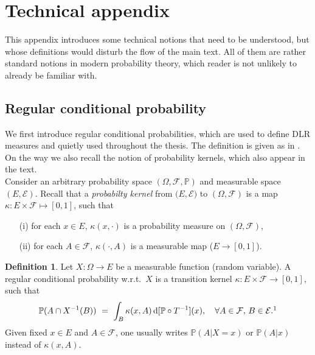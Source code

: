 \documentclass[12pt]{article}
\renewcommand{\d}{\mathrm{d}}
\newcommand{\F}{\mathcal{F}}
\renewcommand{\P}{\mathbb{P}}
\newcommand{\set}[1]{\left\{#1\right\}}
\newcommand{\ra}{\rightarrow}
\newcommand{\pika}{\boldsymbol{\cdot}}
\newcommand{\1}{\mathbbm{1}}
\newcommand{\5}{\vspace{0.5cm}}
\theoremstyle{definition}
\newtheorem{df}[thm]{Definition}
\begin{document}
\pagebreak




\appendix

\section{Technical appendix}

This appendix introduces some technical notions that need to be understood, but whose definitions would disturb the flow of the main text. All of them are rather standard notions in modern probability theory, which reader is not unlikely to already be familiar with.


\subsection{Regular conditional probability}\label{app:1}

We first introduce regular conditional probabilities, which are used to define DLR measures and quietly used throughout the thesis. The definition is given as in \cite{LFR}. On the way we also recall the notion of probability kernels, which also appear in the text. \\

Consider an arbitrary probability space $(\Omega,\F,\P)$ and measurable space $(E,\mathcal{E})$. Recall that a \textit{probabilty kernel} from $(E,\mathcal{E)}$ to $(\Omega,\F)$ is a map $\kappa:E\times\F\mapsto[0,1]$, such that
\begin{itemize}
	\item[(i)] for each $x\in E$, $\kappa(x,\pika)$ is a probability measure on $(\Omega,\F)$,
	\item[(ii)] for each $A\in\F$, $\kappa(\pika,A)$ is a measurable map ($E\ra[0,1]$).
\end{itemize}

\begin{df}
Let $X:\Omega\ra E$ be a measurable function (random variable). A regular conditional probability w.r.t.~$X$ is a transition kernel $\kappa:E\times\F\ra[0,1]$, such that
$$\P(A\cap X^{-1}(B)) ~=~ \int_B \kappa(x,A)\,\d[\P\circ T^{-1}](x), \quad \forall A\in\F,\,B\in\mathcal{E}.\footnote{Instead of $\P(A\cap X^{-1}(B))$, one could also write $\P(A\cap\set{X\in B)}$ or $\P(A~\text{and}~X\in B)$.}$$ 
Given fixed $x\in E$ and $A\in\F$, one usually writes $\P(A|X=x)$ or $\P(A|x)$ instead of $\kappa(x,A)$.
\end{df}
\end{document}
